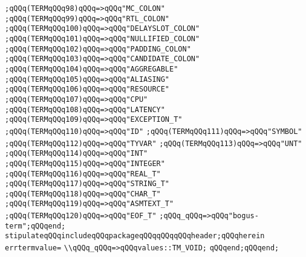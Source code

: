 \verb|;qQQq(TERMqQQq98)qQQq=>qQQq"MC_COLON"|\newline
\verb|;qQQq(TERMqQQq99)qQQq=>qQQq"RTL_COLON"|\newline
\verb|;qQQq(TERMqQQq100)qQQq=>qQQq"DELAYSLOT_COLON"|\newline
\verb|;qQQq(TERMqQQq101)qQQq=>qQQq"NULLIFIED_COLON"|\newline
\verb|;qQQq(TERMqQQq102)qQQq=>qQQq"PADDING_COLON"|\newline
\verb|;qQQq(TERMqQQq103)qQQq=>qQQq"CANDIDATE_COLON"|\newline
\verb|;qQQq(TERMqQQq104)qQQq=>qQQq"AGGREGABLE"|\newline
\verb|;qQQq(TERMqQQq105)qQQq=>qQQq"ALIASING"|\newline
\verb|;qQQq(TERMqQQq106)qQQq=>qQQq"RESOURCE"|\newline
\verb|;qQQq(TERMqQQq107)qQQq=>qQQq"CPU"|\newline
\verb|;qQQq(TERMqQQq108)qQQq=>qQQq"LATENCY"|\newline
\verb|;qQQq(TERMqQQq109)qQQq=>qQQq"EXCEPTION_T"|\newline
\verb|;qQQq(TERMqQQq110)qQQq=>qQQq"ID"|\newline
\verb|;qQQq(TERMqQQq111)qQQq=>qQQq"SYMBOL"|\newline
\verb|;qQQq(TERMqQQq112)qQQq=>qQQq"TYVAR"|\newline
\verb|;qQQq(TERMqQQq113)qQQq=>qQQq"UNT"|\newline
\verb|;qQQq(TERMqQQq114)qQQq=>qQQq"INT"|\newline
\verb|;qQQq(TERMqQQq115)qQQq=>qQQq"INTEGER"|\newline
\verb|;qQQq(TERMqQQq116)qQQq=>qQQq"REAL_T"|\newline
\verb|;qQQq(TERMqQQq117)qQQq=>qQQq"STRING_T"|\newline
\verb|;qQQq(TERMqQQq118)qQQq=>qQQq"CHAR_T"|\newline
\verb|;qQQq(TERMqQQq119)qQQq=>qQQq"ASMTEXT_T"|\newline
\verb|;qQQq(TERMqQQq120)qQQq=>qQQq"EOF_T"|\newline
\verb|;qQQq_qQQq=>qQQq"bogus-term";qQQqend;|\newline
\verb|stipulateqQQqincludeqQQqpackageqQQqqQQqqQQqheader;qQQqherein|\newline
\verb|errtermvalue=|\newline
\verb|\\qQQq_qQQq=>qQQqvalues::TM_VOID;|\newline
\verb|qQQqend;qQQqend;|\newline
